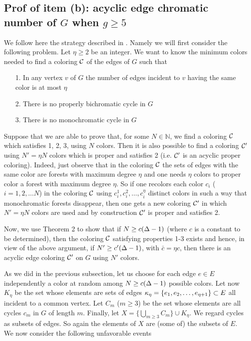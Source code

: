 \documentclass[11pt]{article}
\begin{document}
\subsection{Prof of item (b): acyclic edge chromatic number of $G$ when $g\ge 5$ }

We follow here the strategy described in \cite{MNS}.
Namely we will first consider the following
problem.  Let
 $\eta\ge 2$ be an integer. We want to know the minimum colors  needed   to find a coloring ${\mathcal C}$ of
  the edges of $G$ such that

\begin{itemize}

\item[1.] In any vertex $v$ of $G$ the number of edges incident to $v$ having the same color is at most $\eta$

\item[2.] There is no properly bichromatic cycle in $G$

\item[3.] There is no monochromatic cycle in $G$

\end{itemize}

Suppose that we are able to prove that, for some $N\in \mathbb{N}$, we find a coloring ${\mathcal C}$  which  satisfies 1, 2, 3,
using $N$ colors. Then it is also possible to find a coloring ${\mathcal C}'$ using $N'=\eta N$ colors which is proper and satisfies 2
(i.e. ${\mathcal C}'$ is an acyclic proper coloring).
Indeed,
just observe that in the coloring ${\mathcal C}$ the sets of edges with the same color are forests with maximum degree $\eta$
and one needs $\eta$ colors to proper color a forest with maximum degree $\eta$. So if one recolors
each color $c_i$ ($i=1,2,\dots N$) in the coloring
${\mathcal C}$ using $c_i^1, c_i^2,\dots, c_i^\eta$  distinct colors in such a way that monochromatic forests disappear,
then one gets a new coloring ${\mathcal C}'$ in which $N'=\eta N$ colors are used and by construction ${\mathcal C}'$
is proper and satisfies 2.

Now, we use Theorem 2 to show that if  $N\ge c(\Delta-1)$ (where $c$ is a constant to be determined),
then the coloring ${\mathcal C}$ satisfying properties 1-3 exists and hence, in view of the above argument,
if $N'\ge c'(\Delta-1)$, with ${\bar c}=\eta c$,
then there is an acyclic edge coloring ${\mathcal C}'$ on $G$ using $N'$ colors.


As we did in the previous subsection, let us
choose for each edge $e\in E$ independently a color at random among $N\ge c(\Delta-1)$ possible colors.
Let now $K_\eta$ be the set whose elements are sets of edges  $\kappa_\eta=\{e_1,e_2,\dots,e_{\eta+1}\}\subset E$
all incident to a common vertex.
Let $C_{m}$
($m\ge 3$)  be the set whose elements  are  all cycles $c_m$ in $G$ of length $m$.
Finally, let $X= \{\bigcup_{m\ge 3}C_m\}\cup K_\eta$. We regard cycles  as subsets of edges.
So again the elements of $X$ are (some of) the subsets of $E$.
We now consider the following unfavorable events
\end{document}

